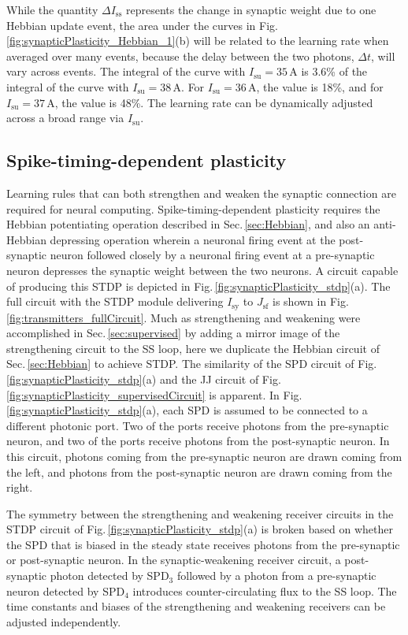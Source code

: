 \documentclass[twocolumn]{article}
\begin{document}
While the quantity $\Delta I_{\mathrm{ss}}$ represents the change in synaptic weight due to one Hebbian update event, the area under the curves in Fig.\,\ref{fig:synapticPlasticity_Hebbian_1}(b) will be related to the learning rate when averaged over many events, because the delay between the two photons, $\Delta t$, will vary across events. The integral of the curve with $I_{\mathrm{su}} = 35$\,\textmu A is 3.6\% of the integral of the curve with $I_{\mathrm{su}} = 38$\,\textmu A. For $I_{\mathrm{su}} = 36$\,\textmu A, the value is 18\%, and for $I_{\mathrm{su}} = 37$\,\textmu A, the value is 48\%. The learning rate can be dynamically adjusted across a broad range via $I_{\mathrm{su}}$.
	
\subsection{\label{sec:stdp}Spike-timing-dependent plasticity}
Learning rules that can both strengthen and weaken the synaptic connection are required for neural computing. Spike-timing-dependent plasticity requires the Hebbian potentiating operation described in Sec.\,\ref{sec:Hebbian}, and also an anti-Hebbian depressing operation wherein a neuronal firing event at the post-synaptic neuron followed closely by a neuronal firing event at a pre-synaptic neuron depresses the synaptic weight between the two neurons. A circuit capable of producing this STDP is depicted in Fig.\,\ref{fig:synapticPlasticity_stdp}(a). The full circuit with the STDP module delivering $I_{\mathrm{sy}}$ to $J_{\mathrm{sf}}$ is shown in Fig.\,\ref{fig:transmitters_fullCircuit}. Much as strengthening and weakening were accomplished in Sec.\,\ref{sec:supervised} by adding a mirror image of the strengthening circuit to the SS loop, here we duplicate the Hebbian circuit of Sec.\,\ref{sec:Hebbian} to achieve STDP. The similarity of the SPD circuit of Fig.\,\ref{fig:synapticPlasticity_stdp}(a) and the JJ circuit of Fig.\,\ref{fig:synapticPlasticity_supervisedCircuit} is apparent. In Fig.\,\ref{fig:synapticPlasticity_stdp}(a), each SPD is assumed to be connected to a different photonic port. Two of the ports receive photons from the pre-synaptic neuron, and two of the ports receive photons from the post-synaptic neuron. In this circuit, photons coming from the pre-synaptic neuron are drawn coming from the left, and photons from the post-synaptic neuron are drawn coming from the right. 

The symmetry between the strengthening and weakening receiver circuits in the STDP circuit of Fig.\,\ref{fig:synapticPlasticity_stdp}(a) is broken based on whether the SPD that is biased in the steady state receives photons from the pre-synaptic or post-synaptic neuron. In the synaptic-weakening receiver circuit, a post-synaptic photon detected by SPD$_3$ followed by a photon from a pre-synaptic neuron detected by SPD$_4$ introduces counter-circulating flux to the SS loop. The time constants and biases of the strengthening and weakening receivers can be adjusted independently.   
\end{document}
